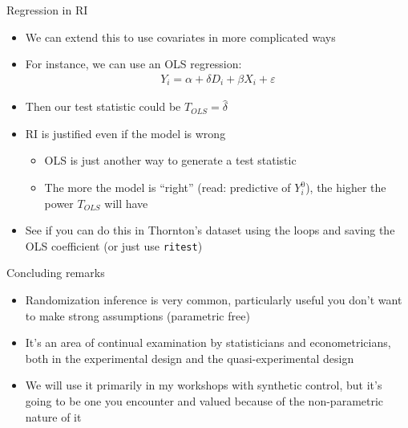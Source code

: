 \documentclass{beamer}
\begin{document}
\begin{frame}{Regression in RI}

\begin{itemize}
\item We can extend this to use covariates in more complicated ways
\item For instance, we can use an OLS regression:
\begin{eqnarray*}
Y_i = \alpha + \delta D_i + \beta X_i +  \varepsilon
\end{eqnarray*}
\item Then our test statistic could be $T_{OLS} = \widehat{\delta}$
\item RI is justified even if the model is wrong
	\begin{itemize}
	\item OLS is just another way to generate a test statistic
	\item The more the model is ``right'' (read: predictive of $Y_i^0$), the higher the power $T_{OLS}$ will have
	\end{itemize}
\item See if you can do this in Thornton's dataset using the loops and saving the OLS coefficient (or just use \texttt{ritest})
\end{itemize}

\end{frame}

\begin{frame}{Concluding remarks}

\begin{itemize}
\item Randomization inference is very common, particularly useful you don't want to make strong assumptions (parametric free)
\item It's an area of continual examination by statisticians and econometricians, both in the experimental design and the quasi-experimental design
\item We will use it primarily in my workshops with synthetic control, but it's going to be one you encounter and valued because of the non-parametric nature of it
\end{itemize}

\end{frame}
\end{document}
